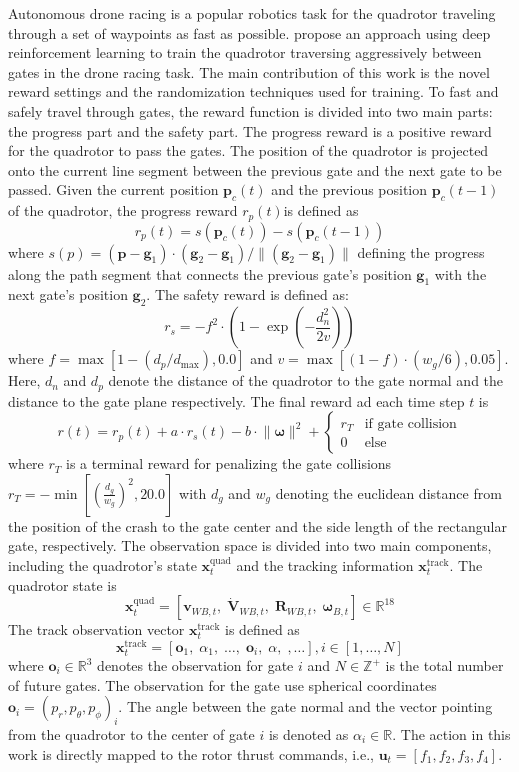 \documentclass{article}
\newcommand{\B}[1]{\mathbf{#1}}
\begin{document}
Autonomous drone racing is a popular robotics task for the 
quadrotor traveling through a set of waypoints as fast as possible. 
\textcite{song2021autonomous} propose an approach
using deep reinforcement learning to train the quadrotor 
traversing aggressively between gates in the drone racing task.
The main contribution of this work is the novel reward settings 
and the randomization techniques used for training.
To fast and safely travel through gates, the reward function is divided into
two main parts: the progress part and the safety part.
The progress reward is a positive reward for the quadrotor to pass
the gates.
The position of the quadrotor is projected onto the current line 
segment between the previous gate and the next gate to be passed.
Given the current position $\B{p}_c(t)$ and the previous position 
$\B{p}_c(t-1)$ of the quadrotor, the progress reward $r_{{p}}(t)$is defined as 
\[
  r_{{p}}(t) = s(\B{p}_c(t)) - s(\B{p}_c(t-1))
\]
where $s({p}) = (\B{p} - \B{g}_1) \cdot (\B{g}_2 - \B{g}_1) / \lVert (\B{g}_2 - \B{g}_1) \rVert$ defining the progress along the path
segment that connects the previous gate's position $\B{g}_1$ 
with the next gate's position $\B{g}_2$.
The safety reward is defined as: 
\[
  r_{s} = - f^2 \cdot \left(
    1 - \exp\left(- \frac{d_n^2}{2v}\right)
  \right)
\]
where $f = \max\left[1 - (d_p / d_{\max}), 0.0\right]$
and $v = \max\left[ (1-f)\cdot(w_g/6), 0.05 \right]$.
Here, $d_n$ and $d_p$ denote the distance of the quadrotor 
to the gate normal and the distance to the gate plane respectively.
The final reward ad each time step $t$ is 
\[
  r(t) = r_{p}(t) + a \cdot r_s(t) - b \cdot \lVert \boldsymbol{\omega} \rVert^2 + 
  \begin{cases}
    r_T & \text{if gate collision} \\
    0 & \text{else}
  \end{cases}
\]
where $r_T$ is a terminal reward for penalizing the gate collisions
$r_T = -\min\left[\left(\frac{d_g}{w_g}\right)^2, 20.0\right]$
with $d_g$ and $w_g$ denoting the euclidean distance from the 
position of the crash to the gate center and the side length 
of the rectangular gate, respectively.
The observation space is divided into two main components, including 
the quadrotor's state $\B{x}_t^{\text{quad}}$ and the tracking information
$\B{x}_t^{\text{track}}$.
The quadrotor state is 
\[\B{x}_t^{\text{quad}} = \left[
  \B{v}_{WB,t}, \;
  \dot{\B{V}}_{WB,t}, \;
  \B{R}_{WB,t}, \;
  \boldsymbol{\omega}_{B,t}
\right] \in \mathbb{R}^{18}
\]
The track observation vector $\B{x}_t^{\text{track}}$
is defined as 
\[
  \B{x}_t^{\text{track}} = \left[
    \B{o}_1, \;
    \alpha_1, \;
    \dots, \;
    \B{o}_i, \;
    \alpha, \;, 
    \dots
  \right], 
  i\in\left[1,\dots,N\right]
\]
where $\B{o}_i \in \mathbb{R}^3$ denotes the observation for 
gate $i$ and $N\in\mathbb{Z}^+$ is the total number of future
gates.
The observation for the gate use spherical coordinates 
$\B{o}_i = \left(p_r, p_\theta, p_\phi\right)_i$.
The angle between the gate normal and the vector pointing from the 
quadrotor to the center of gate $i$ is denoted as $\alpha_i \in \mathbb{R}$.
The action in this work is directly mapped to the rotor 
thrust commands, i.e., $\B{u}_t = \left[ f_1, f_2, f_3, f_4 \right]$.
\end{document}
